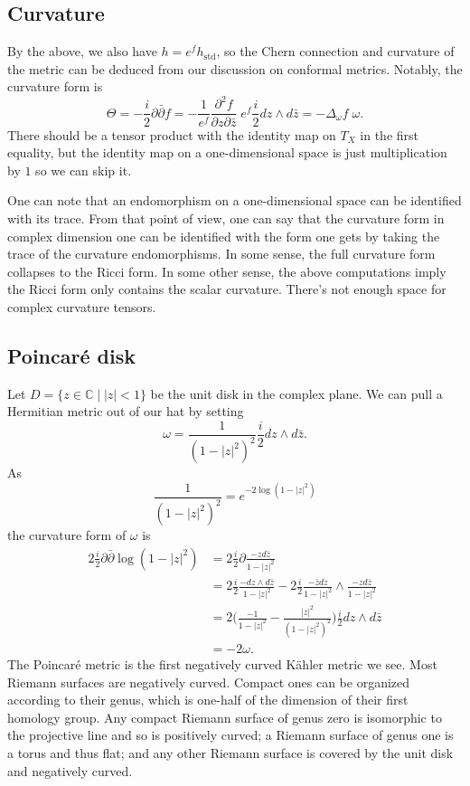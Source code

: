 \documentclass[11pt]{article}
\newcommand{\kk}[1]{\mathbb{#1}}
\begin{document}
\subsection{Curvature}
By the above, we also have $h = e^f h_{\mathrm{std}}$, so the Chern connection and curvature of the metric can be deduced from our discussion on conformal metrics. Notably, the curvature form is
$$
\Theta
= -\frac i2\partial\bar\partial f
= -\frac{1}{e^f}\frac{\partial^2f}{\partial z \partial \bar z} \; e^f \frac{i}{2} dz \wedge d\bar z
= -\Delta_\omega f \; \omega.
$$
There should be a tensor product with the identity map on $T_X$ in the first equality, but the identity map on a one-dimensional space is just multiplication by $1$ so we can skip it.

One can note that an endomorphism on a one-dimensional space can be identified with its trace. From that point of view, one can say that the curvature form in complex dimension one can be identified with the form one gets by taking the trace of the curvature endomorphisms. In some sense, the full curvature form collapses to the Ricci form. In some other sense, the above computations imply the Ricci form only contains the scalar curvature. There's not enough space for complex curvature tensors.


\subsection{Poincar\'e disk}

Let $D = \{z \in \kk C \mid |z| < 1\}$ be the unit disk in the complex plane. We can pull a Hermitian metric out of our hat by setting
$$
\omega = \frac 1{(1-|z|^2)^2} \frac i2 dz \wedge d\bar z.
$$
As
$$
\frac 1{(1-|z|^2)^2} = e^{-2\log(1-|z|^2)}
$$
the curvature form of $\omega$ is
\begin{align*}
2\frac i2 \partial\bar\partial \log(1-|z|^2)
&= 2\frac i2 \partial \frac{-z d\bar z}{1-|z|^2}
\\
&= 2\frac i2 \frac{- dz \wedge d\bar z}{1-|z|^2}
- 2\frac i2 \frac{-\bar z dz}{1-|z|^2} \wedge \frac{-zd\bar z}{1-|z|^2}
\\
&= 2\biggl(\frac{-1}{1-|z|^2} - \frac{|z|^2}{(1-|z|^2)^2} \biggr) \frac i2 dz \wedge d\bar z
\\
&= -2 \omega.
\end{align*}
The Poincar\'e metric is the first negatively curved K\"ahler metric we see. Most Riemann surfaces are negatively curved. Compact ones can be organized according to their genus, which is one-half of the dimension of their first homology group. Any compact Riemann surface of genus zero is isomorphic to the projective line and so is positively curved; a Riemann surface of genus one is a torus and thus flat; and any other Riemann surface is covered by the unit disk and negatively curved.
\end{document}
